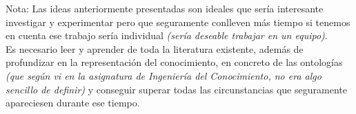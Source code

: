 \documentclass[a4paper,12pt]{report}
\begin{document}
\vspace{15mm}
{\setlength{\parindent}{0cm}
Nota: Las ideas anteriormente presentadas son ideales que sería interesante investigar y experimentar pero que seguramente conlleven más tiempo si tenemos en cuenta ese trabajo sería individual \textit{(sería deseable trabajar en un equipo)}.
\vspace{2mm}\\
Es necesario leer y aprender de toda la literatura existente, además de profundizar en la representación del conocimiento, en concreto de las ontologías \textit{(que según vi en la asignatura de Ingeniería del Conocimiento, no era algo sencillo de definir)} y conseguir superar todas las circunstancias que seguramente apareciesen durante ese tiempo. }

\clearpage
\end{document}

